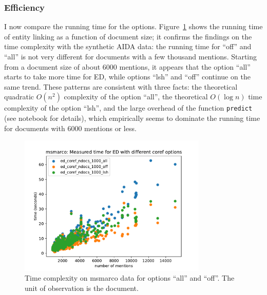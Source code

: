 \documentclass[a4paper,11pt]{article}
\numberwithin{equation}{section} %
\begin{document}
\subsubsection{Efficiency}

I now compare the running time for the options. Figure~\ref{fig:timing_msmarco} shows the running time of entity linking as a function of document size; it confirms the findings on the time complexity with the synthetic AIDA data:  the running time for ``off'' and ``all'' is not very different for documents with a few thousand mentions. 
Starting from a document size of about 6000 mentions, it appears that the option ``all'' starts to take more time for ED, while options ``lsh'' and ``off'' continue on the same trend.
These patterns are consistent with three facts: the theoretical quadratic $O(n^2)$ complexity of the option ``all'', the theoretical $O(\log{n})$ time complexity of the option ``lsh'', and the large overhead of the function \verb|predict| (see notebook for details), which  empirically seems to dominate the running time for documents with 6000 mentions or less.

\begin{figure}[H]
  \centering
  \includegraphics[width = 0.8\textwidth]{../figs/timing_msmarco.pdf}
  \caption{Time complexity on msmarco data for options ``all'' and ``off''. The unit of observation is the document.}
  \label{fig:timing_msmarco}
\end{figure}




\end{document}
